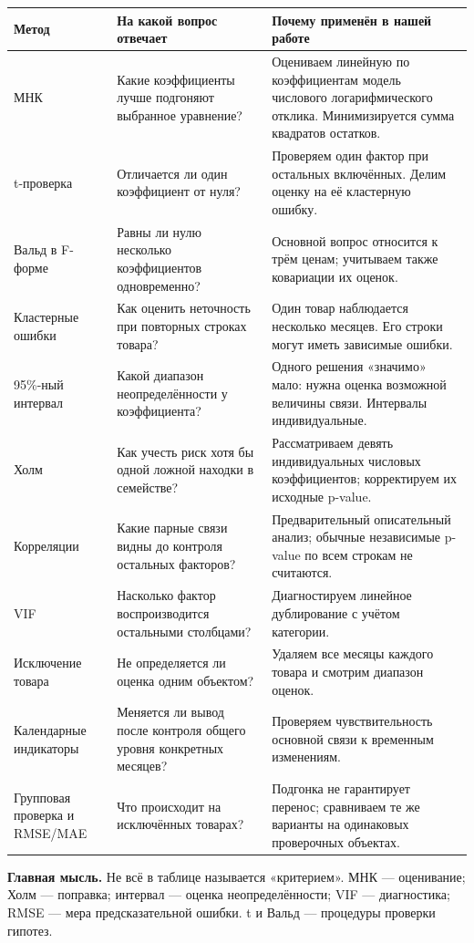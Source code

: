 \documentclass[12pt,a4paper]{article}
\newcommand{\idea}[1]{\par\textbf{Главная мысль.} #1\par}
\begin{document}
\begin{longtable}{p{}p{}p{}}
\toprule Метод & На какой вопрос отвечает & Почему применён в нашей работе\\\midrule\endhead
МНК & Какие коэффициенты лучше подгоняют выбранное уравнение? & Оцениваем линейную по коэффициентам модель числового логарифмического отклика. Минимизируется сумма квадратов остатков.\\
t-проверка & Отличается ли один коэффициент от нуля? & Проверяем один фактор при остальных включённых. Делим оценку на её кластерную ошибку.\\
Вальд в F-форме & Равны ли нулю несколько коэффициентов одновременно? & Основной вопрос относится к трём ценам; учитываем также ковариации их оценок.\\
Кластерные ошибки & Как оценить неточность при повторных строках товара? & Один товар наблюдается несколько месяцев. Его строки могут иметь зависимые ошибки.\\
95\%-ный интервал & Какой диапазон неопределённости у коэффициента? & Одного решения «значимо» мало: нужна оценка возможной величины связи. Интервалы индивидуальные.\\
Холм & Как учесть риск хотя бы одной ложной находки в семействе? & Рассматриваем девять индивидуальных числовых коэффициентов; корректируем их исходные p-value.\\
Корреляции & Какие парные связи видны до контроля остальных факторов? & Предварительный описательный анализ; обычные независимые p-value по всем строкам не считаются.\\
VIF & Насколько фактор воспроизводится остальными столбцами? & Диагностируем линейное дублирование с учётом категории.\\
Исключение товара & Не определяется ли оценка одним объектом? & Удаляем все месяцы каждого товара и смотрим диапазон оценок.\\
Календарные индикаторы & Меняется ли вывод после контроля общего уровня конкретных месяцев? & Проверяем чувствительность основной связи к временным изменениям.\\
Групповая проверка и RMSE/MAE & Что происходит на исключённых товарах? & Подгонка не гарантирует перенос; сравниваем те же варианты на одинаковых проверочных объектах.\\
\bottomrule\end{longtable}

\idea{Не всё в таблице называется «критерием». МНК --- оценивание; Холм --- поправка; интервал --- оценка неопределённости; VIF --- диагностика; RMSE --- мера предсказательной ошибки. t и Вальд --- процедуры проверки гипотез.}
\end{document}

